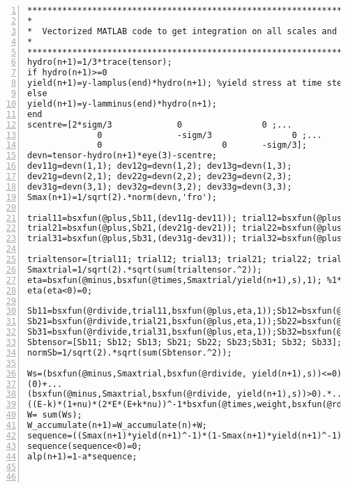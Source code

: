 \clearpage
\begin{lstlisting}[numbers=left, numberstyle=\tiny, keywordstyle=\color{blue!100}, commentstyle=\color{red!30!green!100!blue!100}, frame=shadowbox, rulesepcolor=\color{red!20!green!20!blue!20}]
********************************************************************************************************
*
*  Vectorized MATLAB code to get integration on all scales and optimal time step strategy
*               
********************************************************************************************************
hydro(n+1)=1/3*trace(tensor);
if hydro(n+1)>=0
yield(n+1)=y-lamplus(end)*hydro(n+1); %yield stress at time step n+1
else
yield(n+1)=y-lamminus(end)*hydro(n+1);    
end
scentre=[2*sigm/3             0                0 ;...
              0               -sigm/3                0 ;...
              0                        0       -sigm/3];
devn=tensor-hydro(n+1)*eye(3)-scentre;
dev11g=devn(1,1); dev12g=devn(1,2); dev13g=devn(1,3);
dev21g=devn(2,1); dev22g=devn(2,2); dev23g=devn(2,3);
dev31g=devn(3,1); dev32g=devn(3,2); dev33g=devn(3,3);
Smax(n+1)=1/sqrt(2).*norm(devn,'fro');

trial11=bsxfun(@plus,Sb11,(dev11g-dev11)); trial12=bsxfun(@plus,Sb12,(dev12g-dev12));trial13=bsxfun(@plus,Sb13,(dev13g-dev13));
trial21=bsxfun(@plus,Sb21,(dev21g-dev21)); trial22=bsxfun(@plus,Sb22,(dev22g-dev22));trial23=bsxfun(@plus,Sb23,(dev23g-dev23));
trial31=bsxfun(@plus,Sb31,(dev31g-dev31)); trial32=bsxfun(@plus,Sb32,(dev32g-dev32));trial33=bsxfun(@plus,Sb33,(dev33g-dev33));

trialtensor=[trial11; trial12; trial13; trial21; trial22; trial23;trial31; trial32; trial33];
Smaxtrial=1/sqrt(2).*sqrt(sum(trialtensor.^2));
eta=bsxfun(@minus,bsxfun(@times,Smaxtrial/yield(n+1),s),1); %1*64
eta(eta<0)=0;

Sb11=bsxfun(@rdivide,trial11,bsxfun(@plus,eta,1));Sb12=bsxfun(@rdivide,trial12,bsxfun(@plus,eta,1));Sb13=bsxfun(@rdivide,trial13,bsxfun(@plus,eta,1));
Sb21=bsxfun(@rdivide,trial21,bsxfun(@plus,eta,1));Sb22=bsxfun(@rdivide,trial22,bsxfun(@plus,eta,1));Sb23=bsxfun(@rdivide,trial23,bsxfun(@plus,eta,1));
Sb31=bsxfun(@rdivide,trial31,bsxfun(@plus,eta,1));Sb32=bsxfun(@rdivide,trial32,bsxfun(@plus,eta,1));Sb33=bsxfun(@rdivide,trial33,bsxfun(@plus,eta,1));
Sbtensor=[Sb11; Sb12; Sb13; Sb21; Sb22; Sb23;Sb31; Sb32; Sb33];
normSb=1/sqrt(2).*sqrt(sum(Sbtensor.^2));

Ws=(bsxfun(@minus,Smaxtrial,bsxfun(@rdivide, yield(n+1),s))<=0).*...
(0)+...
(bsxfun(@minus,Smaxtrial,bsxfun(@rdivide, yield(n+1),s))>0).*...
((E-k)*(1+nu)*(2*E*(E+k*nu))^-1*bsxfun(@times,weight,bsxfun(@rdivide,bsxfun(@times,bsxfun(@minus,Smaxtrial,bsxfun(@rdivide, yield(n+1),s)),yield(n+1)),s)));
W= sum(Ws);
W_accumulate(n+1)=W_accumulate(n)+W;
sequence=((Smax(n+1)*yield(n+1)^-1)*(1-Smax(n+1)*yield(n+1)^-1)^-1)^fb;
sequence(sequence<0)=0;
alp(n+1)=1-a*sequence;



\end{lstlisting}
